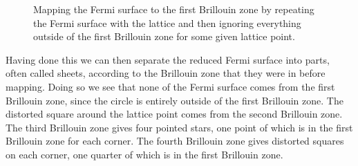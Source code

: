 \documentclass[fleqn]{NotesClass}
\begin{document}
    \begin{figure}
        \caption[Reduced Fermi surface.]{Mapping the Fermi surface to the first Brillouin zone by repeating the Fermi surface with the lattice and then ignoring everything outside of the first Brillouin zone for some given lattice point.}
        \label{fig:map fermi surface to first brillouin zone}
    \end{figure}
    
    Having done this we can then separate the reduced Fermi surface into parts, often called sheets, according to the Brillouin zone that they were in before mapping.
    Doing so we see that none of the Fermi surface comes from the first Brillouin zone, since the circle is entirely outside of the first Brillouin zone.
    The distorted square around the lattice point comes from the second Brillouin zone.
    The third Brillouin zone gives four pointed stars, one point of which is in the first Brillouin zone for each corner.
    The fourth Brillouin zone gives distorted squares on each corner, one quarter of which is in the first Brillouin zone.
    
\end{document}
